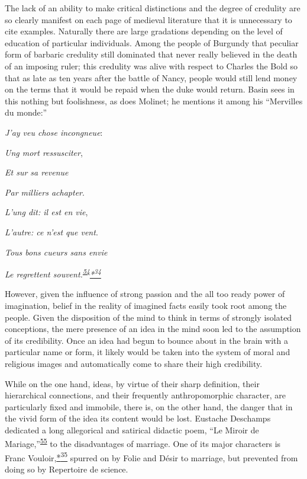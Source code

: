 The lack of an ability to make critical distinctions and the degree of
credulity are so clearly manifest on each page of medieval
litera\protect\hypertarget{18_Chapter_Eleven__THE_FORMS_OF_THO.xhtmlux5cux23page_284}{}{}ture
that it is unnecessary to cite examples. Naturally there are large
gradations depending on the level of education of particular
individuals. Among the people of Burgundy that peculiar form of barbaric
credulity still dominated that never really believed in the death of an
imposing ruler; this credulity was alive with respect to Charles the
Bold so that as late as ten years after the battle of Nancy, people
would still lend money on the terms that it would be repaid when the
duke would return. Basin sees in this nothing but foolishness, as does
Molinet; he mentions it among his ``Mervilles du monde:''

\emph{J'ay veu chose incongneue}:

\emph{Ung mort ressusciter},

\emph{Et sur sa revenue}

\emph{Par milliers achapter}.

\emph{L'ung dit: il est en vie},

\emph{L'autre: ce n'est que vent}.

\emph{Tous bons cueurs sans envie}

\emph{Le regrettent
souvent.\textsuperscript{\protect\hypertarget{18_Chapter_Eleven__THE_FORMS_OF_THO.xhtmlux5cux23id_525}{\protect\hyperlink{23_NOTES.xhtmlux5cux23id_526}{54}}}\protect\hypertarget{18_Chapter_Eleven__THE_FORMS_OF_THO.xhtmlux5cux23id_2631}{\protect\hyperlink{23_NOTES.xhtmlux5cux23id_2632}{*\textsuperscript{34}}}}

However, given the influence of strong passion and the all too ready
power of imagination, belief in the reality of imagined facts easily
took root among the people. Given the disposition of the mind to think
in terms of strongly isolated conceptions, the mere presence of an idea
in the mind soon led to the assumption of its credibility. Once an idea
had begun to bounce about in the brain with a particular name or form,
it likely would be taken into the system of moral and religious images
and automatically come to share their high credibility.

While on the one hand, ideas, by virtue of their sharp definition, their
hierarchical connections, and their frequently anthropomorphic
character, are particularly fixed and immobile, there is, on the other
hand, the danger that in the vivid form of the idea its content would be
lost. Eustache Deschamps dedicated a long allegorical and satirical
didactic poem, ``Le Miroir de
Mariage,''\textsuperscript{\protect\hypertarget{18_Chapter_Eleven__THE_FORMS_OF_THO.xhtmlux5cux23id_523}{\protect\hyperlink{23_NOTES.xhtmlux5cux23id_524}{55}}}
to the
disad\protect\hypertarget{18_Chapter_Eleven__THE_FORMS_OF_THO.xhtmlux5cux23page_285}{}{}vantages
of marriage. One of its major characters is Franc
Vouloir,\protect\hypertarget{18_Chapter_Eleven__THE_FORMS_OF_THO.xhtmlux5cux23id_2347}{\protect\hyperlink{23_NOTES.xhtmlux5cux23id_2348}{*\textsuperscript{35}}}
spurred on by Folie and Désir to marriage, but prevented from doing so
by Repertoire de science.

